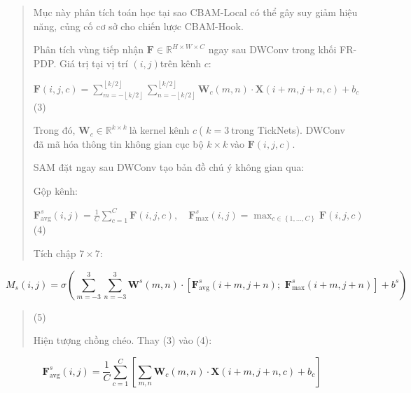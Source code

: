 \documentclass[
]{article}
\begin{document}
\begin{quote}
Mục này phân tích toán học tại sao CBAM-Local có thể gây suy giảm hiệu
năng, củng cố cơ sở cho chiến lược CBAM-Hook.

Phân tích vùng tiếp nhận
\(\mathbf{F} \in \mathbb{R}^{H \times W \times C}\) ngay sau DWConv
trong khối FR-PDP. Giá trị tại vị trí \((i,j)\)trên kênh \(c\):

\(\mathbf{F}(i,j,c) = \sum_{m = - \left\lfloor k/2 \right\rfloor}^{\left\lfloor k/2 \right\rfloor}{\sum_{n = - \left\lfloor k/2 \right\rfloor}^{\left\lfloor k/2 \right\rfloor}\mathbf{W}_{c}}(m,n) \cdot \mathbf{X}(i + m,j + n,c) + b_{c}\)
(3)

Trong đó, \(\mathbf{W}_{c} \in \mathbb{R}^{k \times k}\ \)là kernel kênh
\(c\ \)( \(k = 3\ \)trong TickNets). DWConv đã mã hóa thông tin không
gian cục bộ \(k \times k\ \)vào \(\mathbf{F}(i,j,c)\).

SAM đặt ngay sau DWConv tạo bản đồ chú ý không gian qua:

Gộp kênh:

\(\mathbf{F}_{\text{avg}}^{s}(i,j) = \frac{1}{C}\sum_{c = 1}^{C}\mathbf{F}(i,j,c),\quad\mathbf{F}_{\text{max}}^{s}(i,j) = \max_{c \in \left\{ 1,\ldots,C \right\}}{\mathbf{F}(i,j,c)}\)
(4)

Tích chập \(7 \times 7\):
\end{quote}

\[M_{s}(i,j) = \sigma\left( \sum_{m = - 3}^{3}{\sum_{n = - 3}^{3}\mathbf{W}^{s}}(m,n) \cdot \left\lbrack \mathbf{F}_{\text{avg}}^{s}(i + m,j + n);\mspace{6mu}\mathbf{F}_{\text{max}}^{s}(i + m,j + n) \right\rbrack + b^{s} \right)\]

\begin{quote}
(5)

Hiện tượng chồng chéo. Thay (3) vào (4):
\end{quote}

\[\mathbf{F}_{\text{avg}}^{s}(i,j) = \frac{1}{C}\sum_{c = 1}^{C}\left\lbrack \sum_{m,n}^{}\mathbf{W}_{c}(m,n) \cdot \mathbf{X}(i + m,j + n,c) + b_{c} \right\rbrack\]
\end{document}

